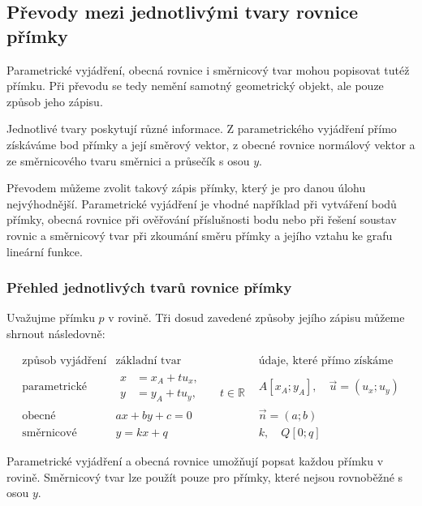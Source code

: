 \subsection{Převody mezi jednotlivými tvary rovnice přímky}
\label{subsec:Conversions_between_line_forms}

Parametrické vyjádření, obecná rovnice i směrnicový tvar mohou
popisovat tutéž přímku. Při převodu se tedy nemění samotný geometrický
objekt, ale pouze způsob jeho zápisu.

Jednotlivé tvary poskytují různé informace. Z parametrického vyjádření
přímo získáváme bod přímky a její směrový vektor, z obecné rovnice
normálový vektor a ze směrnicového tvaru směrnici a průsečík s osou
$y$.

Převodem můžeme zvolit takový zápis přímky, který je pro danou úlohu
nejvýhodnější. Parametrické vyjádření je vhodné například při vytváření
bodů přímky, obecná rovnice při ověřování příslušnosti bodu nebo při
řešení soustav rovnic a směrnicový tvar při zkoumání směru přímky
a jejího vztahu ke grafu lineární funkce.

\subsubsection{Přehled jednotlivých tvarů rovnice přímky}
\label{subsubsec:Overview_line_forms}

Uvažujme přímku $p$ v rovině. Tři dosud zavedené způsoby jejího zápisu
můžeme shrnout následovně:

\begingroup
\renewcommand{\arraystretch}{1.7}
\[
\begin{array}{c|c|c}
    \text{způsob vyjádření}
    &
    \text{základní tvar}
    &
    \text{údaje, které přímo získáme}
    \\
    \hline
    \text{parametrické}
    &
    \begin{aligned}
        x&=x_A+t u_x,\\
        y&=y_A+t u_y,
        \qquad t\in\mathbb{R}
    \end{aligned}
    &
    A[x_A;y_A],\quad
    \vec{u}=(u_x;u_y)
    \\[4mm]
    \text{obecné}
    &
    ax+by+c=0
    &
    \vec{n}=(a;b)
    \\[2mm]
    \text{směrnicové}
    &
    y=kx+q
    &
    k,\quad Q[0;q]
\end{array}
\]
\endgroup

Parametrické vyjádření a obecná rovnice umožňují popsat každou přímku
v rovině. Směrnicový tvar lze použít pouze pro přímky, které nejsou
rovnoběžné s osou $y$.

